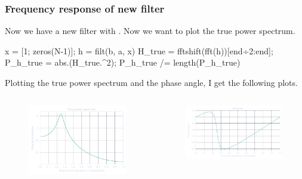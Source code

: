 \documentclass[compress,aspectratio=169]{beamer}
\begin{document}
\begin{frame}[fragile] %
    \frametitle{Frequency response of new filter}
    Now we have a new filter with . Now we
    want to plot the true power spectrum.

    \begin{jllisting}[gobble=8]
        x = [1; zeros(N-1)]; h = filt(b, a, x)
        H_true = fftshift(fft(h))[end÷2:end];
        P_h_true = abs.(H_true.^2); P_h_true /= length(P_h_true)
    \end{jllisting}

    Plotting the true power spectrum and the phase angle, I get the following
    plots.

    \begin{columns}
        \begin{column}{0.45\textwidth}
            \begin{figure}
                \includegraphics[width=\columnwidth]{"../5.pdf"}
            \end{figure}
        \end{column}
        \begin{column}{0.55\textwidth}
            \begin{figure}
                \includegraphics[width=\columnwidth]{"../6.pdf"}
            \end{figure}
        \end{column}
    \end{columns}
\end{frame}
\end{document}

